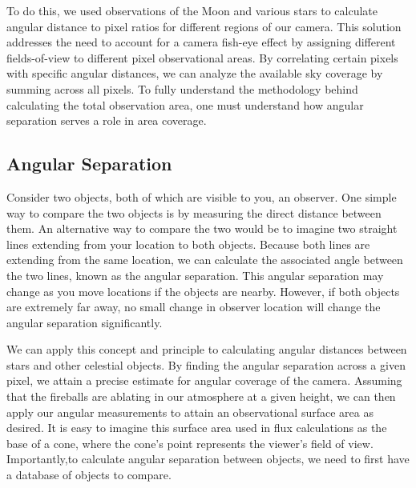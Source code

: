 To do this, we used observations of the Moon and various stars to calculate angular distance to pixel ratios for different regions of our camera.
This solution addresses the need to account for a camera fish-eye effect by assigning different fields-of-view to different pixel observational areas.
By correlating certain pixels with specific angular distances, we can analyze the available sky coverage by summing across all pixels.
To fully understand the methodology behind calculating the total observation area, one must understand how angular separation serves a role in area coverage.

\subsection{Angular Separation}

Consider two objects, both of which are visible to you, an observer.
One simple way to compare the two objects is by measuring the direct distance between them.  
An alternative way to compare the two would be to imagine two straight lines extending from your location to both objects.  
Because both lines are extending from the same location, we can calculate the associated angle between the two lines, known as the angular separation.
This angular separation may change as you move locations if the objects are nearby. However, if both objects are extremely far away, no small change in observer location will change the angular separation significantly.

We can apply this concept and principle to calculating angular distances between stars and other celestial objects.
By finding the angular separation across a given pixel, we attain a precise estimate for angular coverage of the camera.
Assuming that the fireballs are ablating in our atmosphere at a given height, we can then apply our angular measurements to attain an observational surface area as desired.
It is easy to imagine this surface area used in flux calculations as the base of a cone, where the cone's point represents the viewer's field of view.
Importantly,to calculate angular separation between objects, we need to first have a database of objects to compare.

